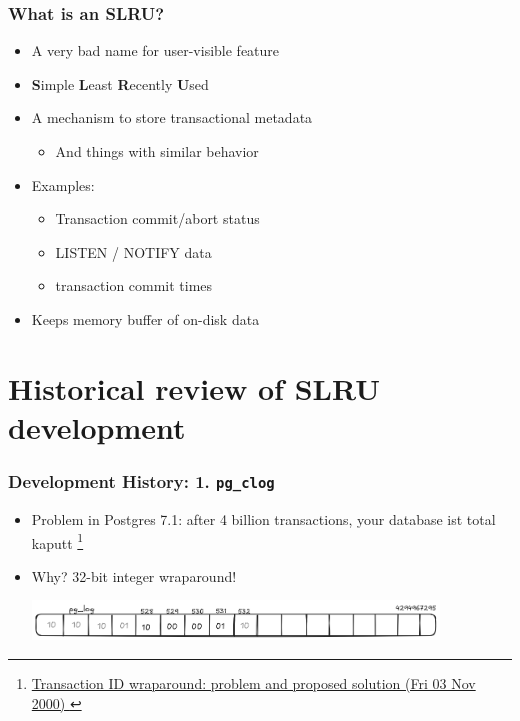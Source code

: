 \begin{frame}
   \frametitle{What {\bf is} an SLRU?}
   \begin{itemize}
     \item A very bad name for user-visible feature
      \item {\bf S}imple {\bf L}east {\bf R}ecently {\bf U}sed
      \item A mechanism to store transactional metadata
	 \begin{itemize}
	    \item And things with similar behavior
	 \end{itemize}
      \item Examples:
	 \begin{itemize}
	    \item Transaction commit/abort status
	    \item LISTEN / NOTIFY data
	    \item transaction commit times
	 \end{itemize}
      \item Keeps memory buffer of on-disk data
   \end{itemize}
\end{frame}

\section{Historical review of SLRU development}
\begin{frame}
  \sectionpage
\end{frame}


\begin{frame}
  \frametitle{Development History: 1. \texttt{pg\_clog}}
  \begin{itemize}
    \item Problem in Postgres 7.1: after 4 billion transactions, your database ist total kaputt \footnote{%
	\fontsize{6}{8}\selectfont \href{https://www.postgresql.org/message-id/flat/8382.973291660\%40sss.pgh.pa.us}
	{Transaction ID wraparound: problem and proposed solution (Fri 03 Nov 2000) \faExternalLink}}
      \item Why? 32-bit integer wraparound!

      \includegraphics[width=0.85\textwidth]{pg_log.png}
  \end{itemize}
\end{frame}

